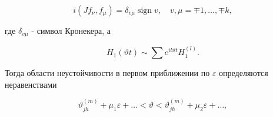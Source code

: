 \documentclass[10pt]{article}
\begin{document}
\[

i\left(J f_{\nu}, f_{\mu}\right)=\delta_{v \mu} \operatorname{sign} v, \quad v, \mu=\mp 1, \ldots, \mp k,

\]



где $\delta_{v \mu}$ - символ Кронекера, а



\[

H_{1}(\vartheta t) \sim \sum e^{i l \vartheta t} H_{1}^{(l)} .

\]



Тогда области неустойчивости в первом приближении по $\varepsilon$ определяются неравенствами



\[

\mathfrak{\vartheta}_{j h}^{(m)}+\mu_{1} \varepsilon+\ldots<\vartheta<\vartheta_{j h}^{(m)}+\mu_{2} \varepsilon+\ldots,

\]
\end{document}
